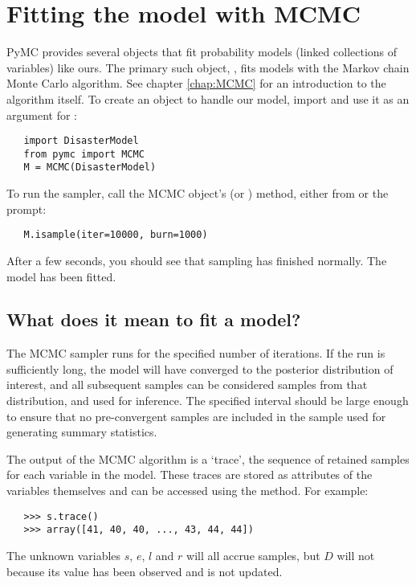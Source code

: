 \section*{Fitting the model with MCMC}

PyMC provides several objects that fit probability models (linked collections of variables) like ours. The primary such object, , fits models with the Markov chain Monte Carlo algorithm. See chapter \ref{chap:MCMC} for an introduction to the algorithm itself. To create an  object to handle our model, import  and use it as an argument for :
\begin{verbatim}
   import DisasterModel
   from pymc import MCMC
   M = MCMC(DisasterModel)
\end{verbatim}
To run the sampler, call the MCMC object's  (or ) method, either from  or the prompt:
\begin{verbatim}
   M.isample(iter=10000, burn=1000)
\end{verbatim}
After a few seconds, you should see that sampling has finished normally. The model has been fitted.

\subsection*{What does it mean to fit a model?}

The MCMC sampler runs for the specified number of iterations. If the run is sufficiently long, the model will have converged to the posterior distribution of interest, and all subsequent samples can be considered samples from that distribution, and used for inference. The specified  interval should be large enough to ensure that no pre-convergent samples are included in the sample used for generating summary statistics.

The output of the MCMC algorithm is a `trace', the sequence of retained samples for each variable in the model. These traces are stored as attributes of the variables themselves and can be accessed using the  method. For example:
\begin{verbatim}
   >>> s.trace()
   >>> array([41, 40, 40, ..., 43, 44, 44])
\end{verbatim}
The unknown variables $s$, $e$, $l$ and $r$ will all accrue samples, but $D$ will not because its value has been observed and is not updated.


